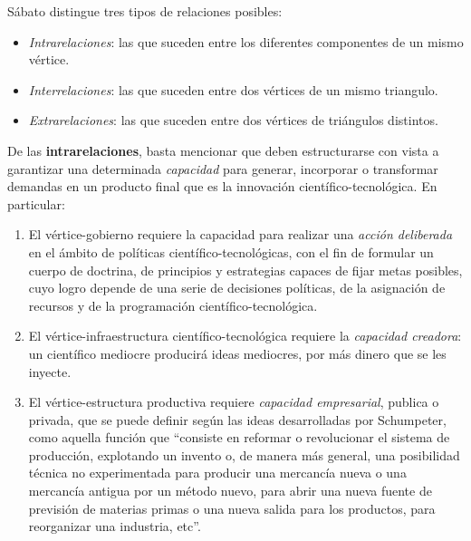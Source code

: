 Sábato distingue tres tipos de relaciones posibles:

\begin{itemize}
    \item \textit{Intrarelaciones}: las que suceden entre los diferentes componentes de un mismo vértice.
    \item \textit{Interrelaciones}: las que suceden entre dos vértices de un mismo triangulo.
    \item \textit{Extrarelaciones}: las que suceden entre dos vértices de triángulos distintos.
\end{itemize}

De las \textbf{intrarelaciones}, basta mencionar que deben estructurarse con vista a garantizar una determinada \textit{capacidad} para generar, incorporar o transformar demandas en un producto final que es la innovación científico-tecnológica. En particular:


\begin{enumerate}
    \item El vértice-gobierno requiere la capacidad para realizar una \textit{acción deliberada} en el ámbito de políticas científico-tecnológicas, con el fin de formular un cuerpo de doctrina, de principios y estrategias capaces de fijar metas posibles, cuyo logro depende de una serie de decisiones políticas, de la asignación de recursos y de la programación científico-tecnológica.
    \item El vértice-infraestructura científico-tecnológica requiere la \textit{capacidad creadora}: un científico mediocre producirá ideas mediocres, por más dinero que se les inyecte.
    \item El vértice-estructura productiva requiere \textit{capacidad empresarial}, publica o privada, que se puede definir según las ideas desarrolladas por Schumpeter, como aquella función que ``consiste en reformar o revolucionar el sistema de producción, explotando un invento o, de manera más general, una posibilidad técnica no experimentada para producir una mercancía nueva o una mercancía antigua por un método nuevo, para abrir una nueva fuente de previsión de materias primas o una nueva salida para los productos, para reorganizar una industria, etc''.
\end{enumerate}

